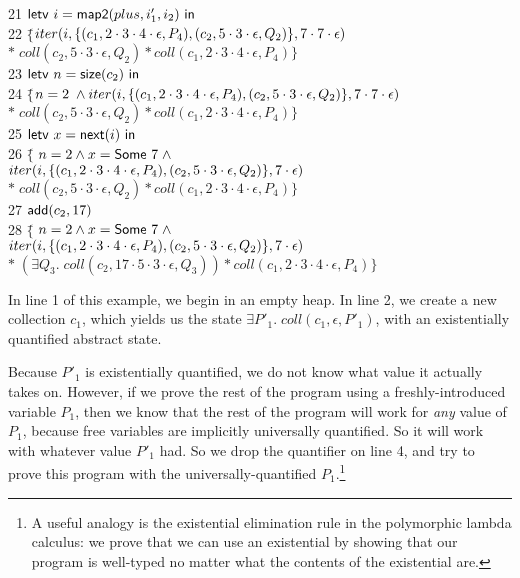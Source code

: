 \documentclass[preprint,natbib]{sigplanconf}
\begin{document}
{\begin{tabbing}
21 \> $\mbox{\textsf{{letv }}}i = \mbox{\textsf{{map2}}}(plus, i'_1, i_2)\mbox{\textsf{{ in }}}$ \\
22 \> $\{$\=$iter(i, \{{(c_1, 2\cdot3\cdot4\cdot\epsilon, P_4), (c_2, 5\cdot3\cdot\epsilon, Q_2)}\}, 7\cdot7\cdot\epsilon)$ \\
\> \> $*\; coll(c_2, 5\cdot3\cdot\epsilon, Q_2) * coll(c_1, 2\cdot3\cdot4\cdot\epsilon, P_4)\}$ \\
23 \> $\mbox{\textsf{{letv }}}n = \mbox{\textsf{{size}}}(c_2)\mbox{\textsf{{ in }}}$ \\
24 \> $\{$\=$n = 2 \;\land
iter(i, \{{(c_1, 2\cdot3\cdot4\cdot\epsilon, P_4), (c_2, 5\cdot3\cdot\epsilon, Q_2)}\}, 7\cdot7\cdot\epsilon)$\\
\>\>$*\;coll(c_2, 5\cdot3\cdot\epsilon, Q_2) * coll(c_1, 2\cdot3\cdot4\cdot\epsilon, P_4)\}$ \\

25 \> $\mbox{\textsf{{letv }}}x = \mbox{\textsf{{next}}}(i)\mbox{\textsf{{ in }}}$ \\
26 \> $\{$\= $n = 2 \land x = \mbox{\textsf{{Some }}}7 \;\land $\\
\> \> $iter(i, \{{(c_1, 2\cdot3\cdot4\cdot\epsilon, P_4), (c_2, 5\cdot3\cdot\epsilon, Q_2)}\}, 7\cdot\epsilon)$ \\
\> \> $*\; coll(c_2, 5\cdot3\cdot\epsilon, Q_2) * coll(c_1, 2\cdot3\cdot4\cdot\epsilon, P_4)\}$ \\
27 \> $\mbox{\textsf{{add}}}(c_2, 17)$ \\
28 \> $\{$\= $n = 2 \land x = \mbox{\textsf{{Some }}}7 \;\land $\\
\> \> $iter(i, \{{(c_1, 2\cdot3\cdot4\cdot\epsilon, P_4), (c_2, 5\cdot3\cdot\epsilon, Q_2)}\}, 7\cdot\epsilon)$ \\ 
\> \> $* \; (\exists Q_3.\; coll(c_2, 17\cdot5\cdot3\cdot\epsilon, Q_3)) * coll(c_1, 2\cdot3\cdot4\cdot\epsilon, P_4)\}$ \\
\end{tabbing}
}

In line 1 of this example, we begin in an empty heap. In line 2, we
create a new collection $c_1$, which yields us the state $\exists
P'_1.\; coll(c_1, \epsilon, P'_1)$, with an existentially quantified
abstract state.

Because $P'_1$ is existentially quantified, we do not know what value
it actually takes on. However, if we prove the rest of the program
using a freshly-introduced variable $P_1$, then we know that the rest
of the program will work for \emph{any} value of $P_1$, because free
variables are implicitly universally quantified.  So it will work with
whatever value $P'_1$ had. So we drop the quantifier on line 4, and
try to prove this program with the universally-quantified
$P_1$.\footnote{A useful analogy is the existential elimination rule
  in the polymorphic lambda calculus: we prove that we can use an
  existential by showing that our program is well-typed no matter what
  the contents of the existential are.}
\end{document}
